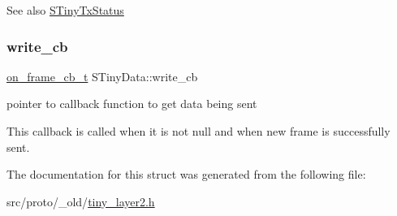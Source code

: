 \begin{DoxySeeAlso}{See also}
\hyperlink{structSTinyTxStatus}{S\+Tiny\+Tx\+Status} 
\end{DoxySeeAlso}
\mbox{\label{structSTinyData_ada334c88e86bfd2c10191f65818c3fb3}} 
\subsubsection{\texorpdfstring{write\+\_\+cb}{write\_cb}}
{\footnotesize\ttfamily \hyperlink{tiny__proto__types_8h_ad6bf709565b8aecb9e6ecf196f219d54}{on\+\_\+frame\+\_\+cb\+\_\+t} S\+Tiny\+Data\+::write\+\_\+cb}



pointer to callback function to get data being sent 

This callback is called when it is not null and when new frame is successfully sent. 

The documentation for this struct was generated from the following file\+:\begin{DoxyCompactItemize}
\item 
src/proto/\+\_\+old/\hyperlink{tiny__layer2_8h}{tiny\+\_\+layer2.\+h}\end{DoxyCompactItemize}
